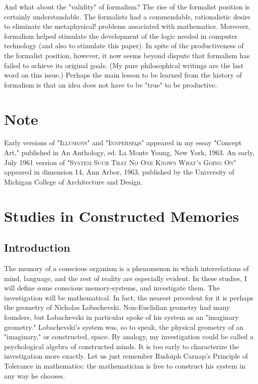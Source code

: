 \documentclass[10pt,twoside]{memoir}
\begin{document}
\begin{enumerate}
{\begin{enumerate}
\begin{sysrules}
\begin{sysrules}
\begin{sysrules}
\begin{sysrules}
And what about the "validity" of formalism? The rise of the formalist 
position is certainly understandable. The formalists had a commendable, 
rationalistic desire to eliminate the metaphysical! problems associated with 
mathematics. Moreover, formalism helped stimulate the development of the 
logic needed in computer technology (and also to stimulate this paper). In 
spite of the productiveness of the formalist position, however, it now seems 
beyond dispute that formalism has failed to achieve its original goals. (My 
pure philosophical writings are the last word on this issue.) Perhaps the main 
lesson to be learned from the history of formalism is that an idea does not 
have to be "true" to be productive. 


\section{Note}
Early versions of \textsc{"Illusions"} and \textsc{"Innperseqs"} appeared in my essay 
"Concept Art," published in An Anthology, ed. La Monte Young, New 
York, 1963. An early, July 1961 version of \textsc{"System Such That No One 
Knows What's Going On"} appeared in dimension 14, Ann Arbor, 1963, 
published by the University of Michigan College of Architecture and Design. 

\section{Studies in Constructed Memories}

\subsection{Introduction}

The memory of a conscious organism is a phenomenon in which 
interrelations of mind, language, and the rest of reality are especially evident. 
In these studies, I will define some conscious memory-systems, and 
investigate them. The investigation will be mathematical. In fact, the nearest 
precedent for it is perhaps the geometry of Nicholas Lobachevski. 
Non-Euclidian geometry had many founders, but Lobachevski in particular 
spoke of his system as an "imaginary geometry." Lobachevski's system was, 
so to speak, the physical geometry of an "imaginary," or constructed, space. 
By analogy, my investigation could be called a psychological algebra of 
constructed minds. It is too early to characterize the investigation more 
exactly. Let us just remember Rudoiph Carnap's Principle of Tolerance in 
mathematics: the mathematician is free to construct his system in any way 
he chooses. 


\end{sysrules}
\end{sysrules}
\end{sysrules}
\end{sysrules}
\end{enumerate}}
\end{enumerate}
\end{document}

